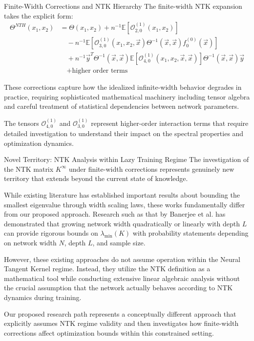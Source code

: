 \documentclass{beamer}
\begin{document}
\begin{frame}{Finite-Width Corrections and NTK Hierarchy}
The finite-width NTK expansion takes the explicit form:
\begin{align}
\Theta^{NTH}(x_1, x_2) &= \Theta(x_1, x_2) + n^{-1}\mathbb{E}[\mathcal{O}^{(1)}_{2,0}(x_1, x_2)] \nonumber \\
&\quad - n^{-1}\mathbb{E}[\mathcal{O}^{(1)}_{3,0}(x_1, x_2, \vec{x})\Theta^{-1}(\vec{x}, \vec{x})f^{(0)}_0(\vec{x})] \nonumber \\
&\quad + n^{-1}\vec{y}^T \Theta^{-1}(\vec{x}, \vec{x})\mathbb{E}[\mathcal{O}^{(1)}_{4,0}(x_1, x_2, \vec{x}, \vec{x})] \Theta^{-1}(\vec{x}, \vec{x})\vec{y} \nonumber \\
&\quad + \text{higher order terms}
\end{align}

These corrections capture how the idealized infinite-width behavior degrades in practice, requiring sophisticated mathematical machinery including tensor algebra and careful treatment of statistical dependencies between network parameters.

The tensors $\mathcal{O}^{(1)}_{4,0}$ and $\mathcal{O}^{(1)}_{3,0}$ represent higher-order interaction terms that require detailed investigation to understand their impact on the spectral properties and optimization dynamics.
\end{frame}

\begin{frame}{Novel Territory: NTK Analysis within Lazy Training Regime}
The investigation of the NTK matrix $K^{\infty}$ under finite-width corrections represents genuinely new territory that extends beyond the current state of knowledge.

While existing literature has established important results about bounding the smallest eigenvalue through width scaling laws, these works fundamentally differ from our proposed approach. Research such as that by Banerjee et al. has demonstrated that growing network width quadratically or linearly with depth $L$ can provide rigorous bounds on $\lambda_{\min}(K)$ with probability statements depending on network width $N$, depth $L$, and sample size.

However, these existing approaches do not assume operation within the Neural Tangent Kernel regime. Instead, they utilize the NTK definition as a mathematical tool while conducting extensive linear algebraic analysis without the crucial assumption that the network actually behaves according to NTK dynamics during training.

Our proposed research path represents a conceptually different approach that explicitly assumes NTK regime validity and then investigates how finite-width corrections affect optimization bounds within this constrained setting.
\end{frame}
\end{document}
